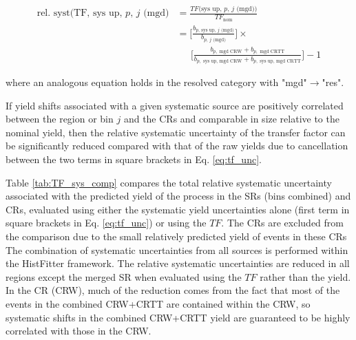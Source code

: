 \begin{equation}
\label{eq:tf_unc}
\begin{aligned}
\text{rel. syst}\text{(TF, sys up, \(p\), \(j\) (mgd)} &= \frac{TF(\text{sys up, \(p\), \(j\) (mgd))}}{TF_\text{nom}} \\ 
&= \Bigg[\frac{b_\text{\(p\), sys up, \(j\) (mgd)}}{b_\text{\(p\), \(j\) (mgd)}}\Bigg] \times \\
& \phantom{xxl} \Bigg[\frac{b_{p,\text{ mgd CRW}}  + b_{p,\text{ mgd CRTT}}}{b_{p,\text{ sys up, mgd CRW}}  + b_{p,\text{ sys up, mgd CRTT}}}\Bigg] -1
\end{aligned}
\end{equation}

\noindent where an analogous equation holds in the resolved category with "mgd"\(\rightarrow\)"res". 

If yield shifts associated with a given systematic source are positively correlated between the region or bin \(j\) and the CRs and comparable in size relative to the nominal yield, then the relative systematic uncertainty of the transfer factor can be significantly reduced compared with that of the raw yields due to cancellation between the two terms in square brackets in Eq. \ref{eq:tf_unc}. 

Table \ref{tab:TF_sys_comp} compares the total relative systematic uncertainty associated with the predicted yield of the \wjets process in the SRs (bins combined) and \wjets CRs, evaluated using either the systematic yield uncertainties alone (first term in square brackets in Eq. \ref{eq:tf_unc}) or using the \(TF\). The \ttbar CRs are excluded from the comparison due to the small relatively predicted yield of \wjets events in these CRs The combination of systematic uncertainties from all sources is performed within the HistFitter framework. The relative systematic uncertainties are reduced in all regions except the merged SR when evaluated using the \(TF\) rather than the yield. In the \wjets CR (CRW), much of the reduction comes from the fact that most of the \wjets events in the combined CRW+CRTT are contained within the CRW, so systematic shifts in the combined CRW+CRTT yield are guaranteed to be highly correlated with those in the CRW. 


